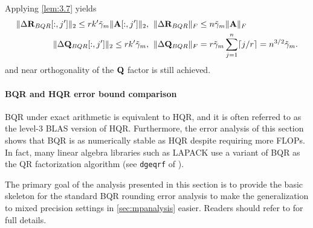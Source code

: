 Applying \cref{lem:3.7} yields 
\begin{align}
\|\Delta \bb{R}_{BQR}[:,j']\|_2 \leq rk'\tilde{\gamma}_{m} \|\bb{A}[:,j']\|_2,&\;\; \|\Delta \bb{R}_{BQR}\|_F \leq n\tilde{\gamma}_{m} \|\bb{A}\|_F\\
\|\Delta \bb{Q}_{BQR}[:,j']\|_2 \leq rk'\tilde{\gamma}_{m},&\;\;\|\Delta \bb{Q}_{BQR}\|_F = r\tilde{\gamma}_{m}\sum_{j=1}^n \lceil j/r\rceil = n^{3/2}\tilde{\gamma}_{m}.\label{eqn:BQRmat}
\end{align}
and near orthogonality of the $\mathbf{Q}$ factor is still achieved.
\paragraph{BQR and HQR error bound comparison}
BQR under exact arithmetic is equivalent to HQR, and it is often referred to as the level-3 BLAS version of HQR. 
Furthermore, the error analysis of this section shows that BQR is as numerically stable as HQR despite requiring more FLOPs.
In fact, many linear algebra libraries such as LAPACK use a variant of BQR as the QR factorization algorithm (see {\tt dgeqrf} of \cite{LAPACK}).

The primary goal of the analysis presented in this section is to provide the basic skeleton for the standard BQR rounding error analysis to make the generalization to mixed precision settings in \cref{sec:mpanalysis} easier.
Readers should refer to \cite{golub2013matrix,Higham2002} for full details.